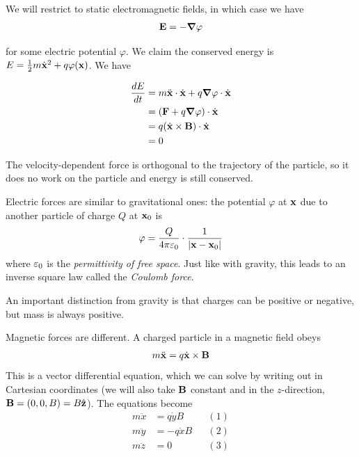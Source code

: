 \documentclass{../template/note}
\begin{document}
    We will restrict to static electromagnetic fields, in which case we have
    \begin{align*}
        \V E = -\grad \varphi
    \end{align*}
    
    for some electric potential \(\varphi\). We claim the conserved energy is \(E = \frac{1}{2}m \dot{\V x}^2 + q\varphi(\V x)\). We have

    \begin{align*}
        \frac{dE}{dt} &= m \ddot{\V x} \cdot \dot{\V x} + q \grad \varphi \cdot \dot{\V x} \\
        &= (\V F + q \grad \varphi) \cdot \dot{\V x} \\
        &= q(\dot{\V x} \times \V B) \cdot \dot{\V x} \\
        &= 0
    \end{align*}
    
    The velocity-dependent force is orthogonal to the trajectory of the particle, so it does no work on the particle and energy is still conserved.

    Electric forces are similar to gravitational ones: the potential \(\varphi\) at \(\V x\) due to another particle of charge \(Q\) at \(\V x_0\) is
    \begin{align*}
        \varphi = \frac{Q}{4 \pi \eps_0} \cdot \frac{1}{|\V x - \V x_0|}
    \end{align*}
    where \(\varepsilon_0\) is the \emph{permittivity of free space}. Just like with gravity, this leads to an inverse square law called the \emph{Coulomb force}.

    An important distinction from gravity is that charges can be positive or negative, but mass is always positive. 

    Magnetic forces are different. A charged particle in a magnetic field obeys
    \begin{align*}
        m \ddot{\V x} = q \dot{\V x} \times \vec B
    \end{align*}
    This is a vector differential equation, which we can solve by writing out in Cartesian coordinates (we will also take \(\V B\) constant and in the \(z\)-direction, \(\V B = (0, 0, B) = B \hvec z\)). The equations become
    \begin{align*}
        m \ddot x &= q \dot y B && (1)\\
        m \ddot y &= -q \dot x B && (2)\\
        m \ddot z &= 0 && (3)
    \end{align*}
    
\end{document}
